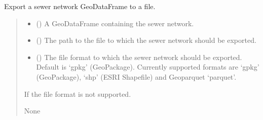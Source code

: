 \documentclass[letterpaper,10pt,english]{sphinxmanual}
\begin{document}
\begin{fulllineitems}
\label{\detokenize{pysewer:pysewer.export.export_sewer_network}}
\pysigstartsignatures
{}
\pysigstopsignatures
\sphinxAtStartPar
Export a sewer network GeoDataFrame to a file.
\begin{quote}\begin{description}
\begin{itemize}
\item {} 
\sphinxAtStartPar
{} () \textendash{} A GeoDataFrame containing the sewer network.

\item {} 
\sphinxAtStartPar
{} () \textendash{} The path to the file to which the sewer network should be exported.

\item {} 
\sphinxAtStartPar
{} () \textendash{} The file format to which the sewer network should be exported. Default is ‘gpkg’ (GeoPackage).
Currently supported formats are ‘gpkg’ (GeoPackage), ‘shp’ (ESRI Shapefile) and Geoparquet ‘parquet’.

\end{itemize}

\sphinxAtStartPar
{} \textendash{} If the file format is not supported.

\sphinxAtStartPar
None

\end{description}\end{quote}

\end{fulllineitems}

\end{document}
